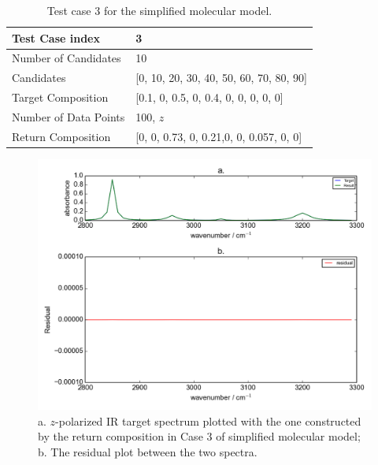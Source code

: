 \begin{table} 
\begin{center}
\begin{tabular}{| l | p{7cm} | }
\hline
Test Case index & 3  \\
\hline
Number of Candidates & 10   \\
\hline
Candidates & [0, 10, 20, 30, 40, 50, 60, 70, 80, 90]  \\
\hline
Target Composition & [0.1, 0, 0.5, 0, 0.4, 0, 0, 0, 0, 0] \\
\hline
Number of Data Points & 100, $z$ \\
\hline
Return Composition & [0, 0, 0.73, 0, 0.21,0, 0, 0.057, 0, 0] \\
\hline
\end{tabular}
\end{center}
\caption{Test case 3 for the simplified molecular model.}
\label{tab:3.2}
\end{table}	

\begin{figure}[!ht] 
\centering
\includegraphics[scale=0.7]{Figures/toy_model_result_plotting_ir_cos_10candi_1.png} 
\caption{a. $z$-polarized IR target spectrum plotted with the one constructed by the return composition in Case 3 of simplified molecular model; b. The residual plot between the two spectra.}
\label{fig:3.3}
\end{figure}

